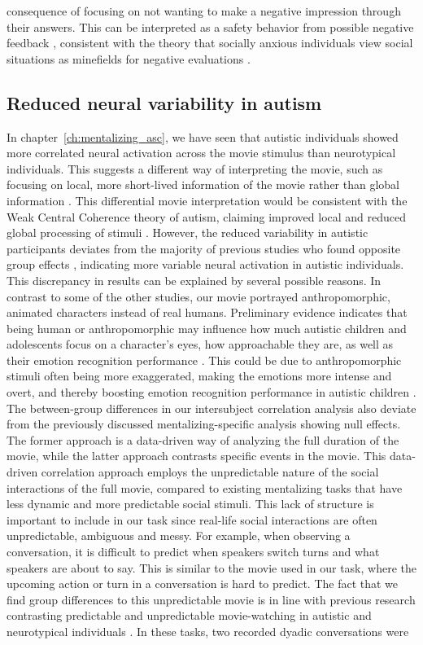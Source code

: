 consequence of focusing on not wanting to make a negative impression through their answers. This can be interpreted as a safety behavior from possible negative feedback \citep{wells1995}, consistent with the theory that socially anxious individuals view social situations as minefields for negative evaluations \citep{rapee1997}. 

\subsection*{Reduced neural variability in autism}

In chapter~\ref{ch:mentalizing_asc}, we have seen that autistic individuals showed more correlated neural activation across the movie stimulus than neurotypical individuals. This suggests a different way of interpreting the movie, such as focusing on local, more short-lived information of the movie rather than global information \citep{barnes2012,geelhand2020}. This differential movie interpretation would be consistent with the Weak Central Coherence theory of autism, claiming improved local and reduced global processing of stimuli \citep{happe1997}. However, the reduced variability in autistic participants deviates from the majority of previous studies who found opposite group effects \citep{byrge2015,hasson2009,lyons2020,salmi2013}, indicating more variable neural activation in autistic individuals. This discrepancy in results can be explained by several possible reasons. In contrast to some of the other studies, our movie portrayed anthropomorphic, animated characters instead of real humans. Preliminary evidence indicates that being human or anthropomorphic may influence how much autistic children and adolescents focus on a character's eyes, how approachable they are, as well as their emotion recognition performance \citep{atherton2018}. This could be due to anthropomorphic stimuli often being more exaggerated, making the emotions more intense and overt, and thereby boosting emotion recognition performance in autistic children \citep{carter2016,rump2009}. The between-group differences in our intersubject correlation analysis also deviate from the previously discussed mentalizing-specific analysis showing null effects. The former approach is a data-driven way of analyzing the full duration of the movie, while the latter approach contrasts specific events in the movie. This data-driven correlation approach employs the unpredictable nature of the social interactions of the full movie, compared to existing mentalizing tasks that have less dynamic and more predictable social stimuli. This lack of structure is important to include in our task since real-life social interactions are often unpredictable, ambiguous and messy. For example, when observing a conversation, it is difficult to predict when speakers switch turns and what speakers are about to say. This is similar to the movie used in our task, where the upcoming action or turn in a conversation is hard to predict. The fact that we find group differences to this unpredictable movie is in line with previous research contrasting predictable and unpredictable movie-watching in autistic and neurotypical individuals \citep{roeyers2001,ponnet2008}. In these tasks, two recorded dyadic conversations were 